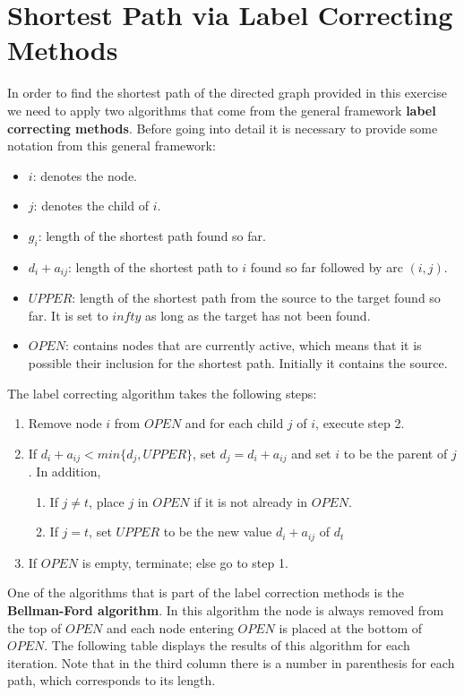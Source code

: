 \documentclass[11pt, oneside]{article}   	%
\begin{document}
\section{Shortest Path via Label Correcting Methods}
In order to find the shortest path of the directed graph provided in this exercise we need to apply two algorithms that come from the general framework \textbf{label correcting methods}. Before going into detail it is necessary to provide some notation from this general framework:
\begin{itemize}
	\item $i$: denotes the node.
	\item $j$: denotes the child of $i$.
	\item $g_{i}$: length of the shortest path found so far.
	\item $d_{i}+a_{ij}$: length of the shortest path to $i$  found so far followed by arc $(i,j)$.
	\item $UPPER$: length of the shortest path from the source to the target found so far. It is set to $infty$ as long as the target has not been found.
	\item $OPEN$: contains nodes that are currently active, which means that it is possible their inclusion for the shortest path. Initially it contains the source.
\end{itemize}
The label correcting algorithm takes the following steps:
\begin{enumerate}
	\item Remove node $i$ from $OPEN$ and for each child $j$ of $i$, execute step 2.
	\item If $d_{i}+a_{ij} < min\{d_{j},UPPER\}$, set $d_{j} = d_{i}+a_{ij}$ and set $i$ to be the parent of $j$. In addition,
	\begin{enumerate}
		\item If $j \neq t$, place $j$ in $OPEN$ if it is not already in $OPEN$.
		\item If $j = t$, set $UPPER$ to be the new value $d_{i}+a_{ij}$ of $d_{t}$
	\end{enumerate}
	\item If $OPEN$ is empty, terminate; else go to step 1.
\end{enumerate}
One of the algorithms that is part of the label correction methods is the \textbf{Bellman-Ford algorithm}. In this algorithm the node is always removed from the top of $OPEN$ and each node entering $OPEN$ is placed at the bottom of $OPEN$. The following table displays the results of this algorithm for each iteration. Note that in the third column there is a number in parenthesis for each path, which corresponds to its length.
\end{document}
